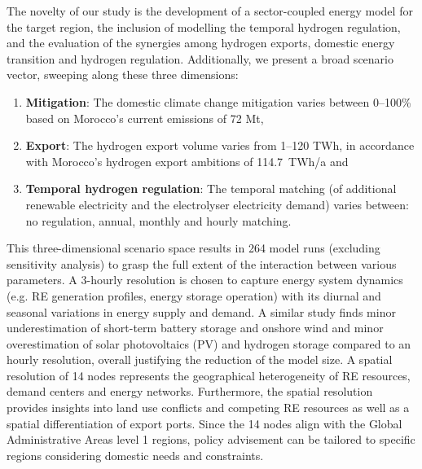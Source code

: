 The novelty of our study is the development of a sector-coupled energy model for the target region, the inclusion of modelling the temporal hydrogen regulation, and the evaluation of the synergies among hydrogen exports, domestic energy transition and hydrogen regulation.
Additionally, we present a broad scenario vector, sweeping along these three dimensions:
\begin{enumerate}
    \item \textbf{Mitigation}: The domestic climate change mitigation varies between 0--100\% based on Morocco's current emissions of 72 Mt\coe,
    \item \textbf{Export}: The hydrogen export volume varies from 1--120 TWh, in accordance with Morocco's hydrogen export ambitions of 114.7~TWh/a and
    \item \textbf{Temporal hydrogen regulation}: The temporal matching (of additional renewable electricity and the electrolyser electricity demand) varies between: no regulation, annual, monthly and hourly matching.
\end{enumerate}
This three-dimensional scenario space results in 264 model runs (excluding sensitivity analysis) to grasp the full extent of the interaction between various parameters.
A 3-hourly resolution is chosen to capture energy system dynamics (e.g. RE generation profiles, energy storage operation) with its diurnal and seasonal variations in energy supply and demand. A similar study \cite{Neumann2022} finds minor underestimation of short-term battery storage and onshore wind and minor overestimation of solar photovoltaics (PV) and hydrogen storage compared to an hourly resolution, overall justifying the reduction of the model size. 
A spatial resolution of 14 nodes represents the geographical heterogeneity of RE resources, demand centers and energy networks. Furthermore, the spatial resolution provides insights into land use conflicts and competing RE resources as well as a spatial differentiation of export ports. Since the 14 nodes align with the Global Administrative Areas level 1 regions, policy advisement can be tailored to specific regions considering domestic needs and constraints.


